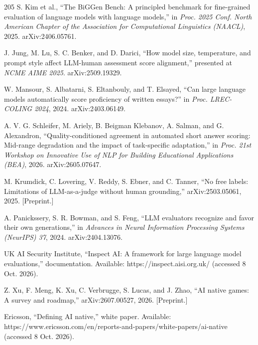 \begin{thebibliography}{205}
 S. Kim et al., ``The BiGGen Bench: A principled benchmark for fine-\allowbreak{}grained evaluation of language models with language models,'' in \textit{Proc. 2025 Conf. North American Chapter of the Association for Computational Linguistics (NAACL)}, 2025. arXiv:2406.\allowbreak{}05761.

 J. Jung, M. Lu, S. C. Benker, and D. Darici, ``How model size, temperature, and prompt style affect LLM-human assessment score alignment,'' presented at \textit{NCME AIME 2025}. arXiv:2509.\allowbreak{}19329.

 W. Mansour, S. Albatarni, S. Eltanbouly, and T. Elsayed, ``Can large language models automatically score proficiency of written essays?'' in \textit{Proc. LREC-COLING 2024}, 2024. arXiv:2403.\allowbreak{}06149.

 A. V. G. Schleifer, M. Ariely, B. Beigman Klebanov, A. Salman, and G. Alexandron, ``Quality-\allowbreak{}conditioned agreement in automated short answer scoring: Mid-range degradation and the impact of task-\allowbreak{}specific adaptation,'' in \textit{Proc. 21st Workshop on Innovative Use of NLP for Building Educational Applications (BEA)}, 2026. arXiv:2605.\allowbreak{}07647.

 M. Krumdick, C. Lovering, V. Reddy, S. Ebner, and C. Tanner, ``No free labels: Limitations of LLM-\allowbreak{}as-\allowbreak{}a-\allowbreak{}judge without human grounding,'' arXiv:2503.\allowbreak{}05061, 2025. [Preprint.]

 A. Panickssery, S. R. Bowman, and S. Feng, ``LLM evaluators recognize and favor their own generations,'' in \textit{Advances in Neural Information Processing Systems (NeurIPS) 37}, 2024. arXiv:2404.\allowbreak{}13076.

 UK AI Security Institute, ``Inspect AI: A framework for large language model evaluations,'' documentation. Available: https:/\allowbreak{}/\allowbreak{}inspect.\allowbreak{}aisi.\allowbreak{}org.\allowbreak{}uk/ (accessed 8 Oct. 2026).

 Z. Xu, F. Meng, K. Xu, C. Verbrugge, S. Lucas, and J. Zhao, ``AI native games: A survey and roadmap,'' arXiv:2607.\allowbreak{}00527, 2026. [Preprint.]

 Ericsson, ``Defining AI native,'' white paper. Available: https:/\allowbreak{}/\allowbreak{}www.\allowbreak{}ericsson.\allowbreak{}com/\allowbreak{}en/\allowbreak{}reports-\allowbreak{}and-\allowbreak{}papers/\allowbreak{}white-\allowbreak{}papers/\allowbreak{}ai-\allowbreak{}native (accessed 8 Oct. 2026).


\end{thebibliography}
